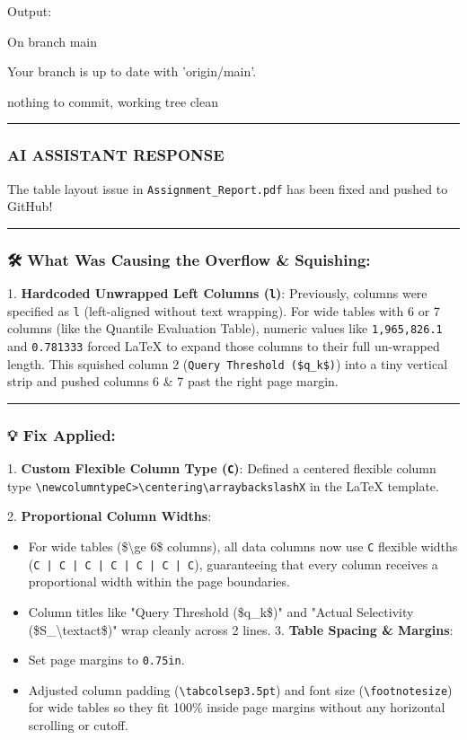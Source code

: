 \documentclass[11pt,a4paper]{article}
\begin{document}
Output:

On branch main

Your branch is up to date with 'origin/main'.


nothing to commit, working tree clean


\hrule

\subsubsection{AI ASSISTANT RESPONSE}

The table layout issue in \texttt{Assignment\_Report.pdf} has been fixed and pushed to GitHub!


\hrule


\subsubsection{🛠️ What Was Causing the Overflow \& Squishing:}
1. \textbf{Hardcoded Unwrapped Left Columns (\texttt{l})}: Previously, columns were specified as \texttt{l} (left-aligned without text wrapping). For wide tables with 6 or 7 columns (like the Quantile Evaluation Table), numeric values like \texttt{1,965,826.1} and \texttt{0.781333} forced LaTeX to expand those columns to their full un-wrapped length. This squished column 2 (\texttt{Query Threshold (\$q\_k\$)}) into a tiny vertical strip and pushed columns 6 \& 7 past the right page margin.


\hrule


\subsubsection{💡 Fix Applied:}
1. \textbf{Custom Flexible Column Type (\texttt{C})}: Defined a centered flexible column type \texttt{\textbackslash{}newcolumntype{C}{>{\textbackslash{}centering\textbackslash{}arraybackslash}X}} in the LaTeX template.

2. \textbf{Proportional Column Widths}:

\begin{itemize}
\item For wide tables (\$\textbackslash{}ge 6\$ columns), all data columns now use \texttt{C} flexible widths (\texttt{C | C | C | C | C | C | C}), guaranteeing that every column receives a proportional width within the page boundaries.
\item Column titles like "Query Threshold (\$q\_k\$)" and "Actual Selectivity (\$S\_{\textbackslash{}text{act}}\$)" wrap cleanly across 2 lines.
3. \textbf{Table Spacing \& Margins}:

\item Set page margins to \texttt{0.75in}.
\item Adjusted column padding (\texttt{\textbackslash{}tabcolsep{3.5pt}}) and font size (\texttt{\textbackslash{}footnotesize}) for wide tables so they fit 100\% inside page margins without any horizontal scrolling or cutoff.
\end{itemize}
\end{document}
